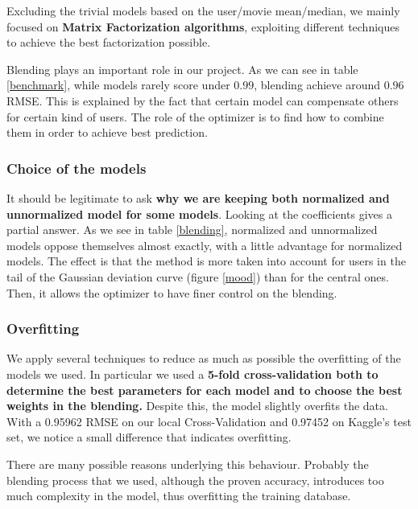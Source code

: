 \documentclass[10pt,conference,compsocconf]{IEEEtran}
\begin{document}
Excluding the trivial models based on the user/movie mean/median, we mainly focused on \textbf{Matrix
Factorization algorithms}, exploiting different techniques to achieve the best factorization
possible. 

Blending plays an important role in our project. As we can see in table \ref{benchmark}, while models rarely score under $0.99$, blending achieve around $0.96$ RMSE. This is explained by the fact that certain model can compensate others for certain kind of users. The role of the optimizer is to find how to combine them in order to achieve best prediction.

\subsubsection{Choice of the models}
\label{choice_model}

It should be legitimate to ask \textbf{why we are keeping both normalized and unnormalized model for
some models}. Looking at the coefficients gives a partial answer. As we see in table \ref{blending}, normalized and unnormalized models oppose themselves almost exactly, with a little advantage for normalized models. The effect is that the method is more taken into account for users in the tail of the Gaussian deviation curve (figure \ref{mood}) than for the central ones. Then, it allows the optimizer to have finer control on the blending.

\subsubsection{Overfitting}
We apply several techniques to reduce as much as possible the overfitting of the models we used. In
particular we used a \textbf{5-fold cross-validation both to determine the best parameters for each model and to
choose the best weights in the blending.}
Despite this, the model slightly overfits the data. With a 0.95962 RMSE on our local Cross-Validation and 0.97452 on Kaggle's test set, we notice a small difference that indicates overfitting.

There are many possible reasons underlying this behaviour. Probably the blending process that we
used, although the proven accuracy, introduces too much complexity in the model, thus overfitting
the training database.



\end{document}
